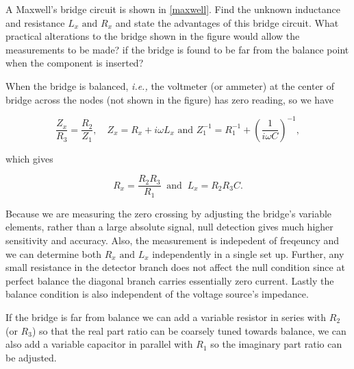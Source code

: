 \documentclass[english,a4paper,12pt]{report}
\begin{document}

{A Maxwell's bridge circuit is shown in \cref{maxwell}. Find the unknown inductance and resistance \(L_{x} \text { and } R_{x}  \) and state the advantages of this bridge circuit. What practical alterations to the bridge shown in the figure would allow the measurements to be made? if the bridge is found to be far from the balance point when the component is inserted?}
{When the bridge is balanced, \textit{i.e.,} the voltmeter (or ammeter) at the center of bridge across the nodes (not shown in the figure) has zero reading, so we have 

\begin{equation}
    \frac{Z_{x}}{R_3 } = \frac{R_2 }{Z_{1} }, \quad Z_{x} = R_{x} + i \omega L_{x} \text { and } Z_1 ^{-1} = R_1 ^{-1} + (\frac{1}{i \omega C} )^{-1} ,      
\end{equation}

which gives 

\begin{equation}
    R_{x} = \frac{R_2 R_3 }{R_1 } ~\text { and }~ L_{x} = R_2 R_3 C.   
\end{equation}

Because we are measuring the zero crossing by adjusting the bridge's variable elements, rather than a large absolute signal, null detection gives much higher sensitivity and accuracy. Also, the measurement is indepedent of freqeuncy and we can determine both \(R_{x} \text { and } L_{x}  \) independently in a single set up. Further, any small resistance in the detector branch does not affect the null condition since at perfect balance the diagonal branch carries essentially zero current. Lastly the balance condition is also independent of the voltage source's impedance.

If the bridge is far from balance we can add a variable resistor in series with \(R_2 \) (or \(R_3 \)) so that the real part ratio can be coarsely tuned towards balance, we can also add a variable capacitor in parallel with \(R_1 \) so the imaginary part ratio can be adjusted. 
} 

\end{document}
